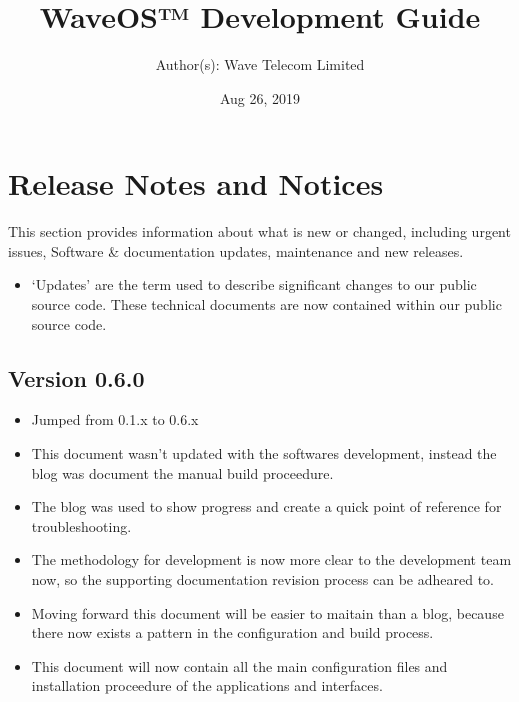 \documentclass[letterpaper,10pt,openany,oneside,english]{sphinxmanual}
\title{WaveOS™ Development Guide}
\date{Aug 26, 2019}
\author{Author(s): Wave Telecom Limited}
\begin{document}
\maketitle
\sphinxtableofcontents
{}\label{\detokenize{index::doc}}




\chapter{Release Notes and Notices}
\label{\detokenize{releasenotes:release-notes-and-notices}}\label{\detokenize{releasenotes::doc}}
This section provides information about what is new or changed, including urgent issues, Software \& documentation updates, maintenance and new releases.
\begin{itemize}
\item {} 
‘Updates’ are the term used to describe significant changes to our public source code. These technical documents are now contained within our public source code.

\end{itemize}


\section{Version 0.6.0}
\label{\detokenize{releasenotes:version-0-6-0}}\begin{itemize}
\item {} 
Jumped from 0.1.x to 0.6.x

\item {} 
This document wasn’t updated with the softwares development, instead the blog was document the manual build proceedure.

\item {} 
The blog was used to show progress and create a quick point of reference for troubleshooting.

\item {} 
The methodology for development is now more clear to the development team now, so the supporting documentation revision process can be adheared to.

\item {} 
Moving forward this document will be easier to maitain than a blog, because there now exists a pattern in the configuration and build process.

\item {} 
This document will now contain all the main configuration files and installation proceedure of the applications and interfaces.

\end{itemize}
\end{document}
